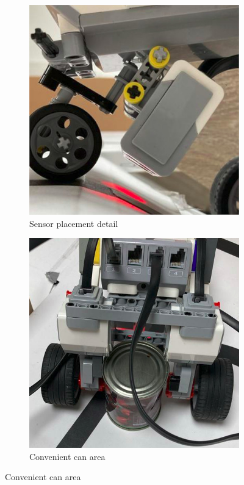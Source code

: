 \documentclass{article}
\begin{document}
\begin{figure}[!htbp]
	\begin{subfigure}{0.4\textwidth}
		\includegraphics[width=\textwidth]{./figures/old-coaster-wheel.jpeg}
		\caption{Sensor placement detail}
	\end{subfigure}
	\hspace{0.01cm}
	\begin{subfigure}{0.4\textwidth}
		\includegraphics[width=\textwidth]{./figures/old-can-placement.jpeg}
		\caption{Convenient can area}
	\end{subfigure}


\end{figure}
\end{document}
